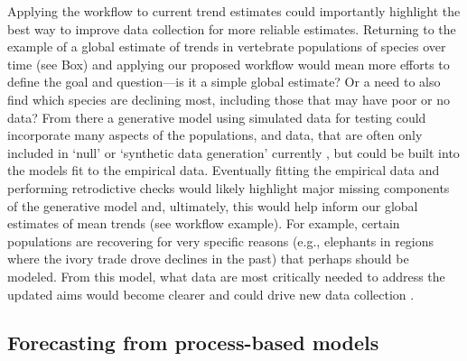 \documentclass[11pt]{article}
\begin{document}
Applying the workflow to current trend estimates could importantly highlight the best way to improve data collection for more reliable estimates. Returning to the example of a global estimate of trends in vertebrate populations of species over time (see Box) and applying our proposed workflow would mean more efforts to define the goal and question---is it a simple global estimate?
Or a need to also find which species are declining most, including those that may have poor or no data? From there a generative model using simulated data for testing could incorporate many aspects of the populations, and data, that are often only included in `null' or `synthetic data generation' currently \citep{Buschke2021,mcrae2025utility}, but could be built into the models fit to the empirical data. Eventually fitting the empirical data and performing retrodictive checks would likely highlight major missing components of the generative model and, ultimately, this would help inform our global estimates of mean trends (see workflow example). For example, certain populations are recovering for very specific reasons (e.g., elephants in regions where the ivory trade drove declines in the past) that perhaps should be modeled. From this model, what data are most critically needed to address the updated aims would become clearer and could drive new data collection \citep{toszogyova2024mathematical}. 

\subsection{Forecasting from process-based models}
\end{document}

